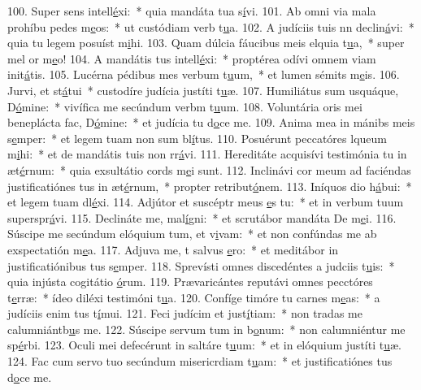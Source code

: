 100. Super sens intell\uline{é}xi:~* quia mandáta tua s\uline{í}vi.
101. Ab omni via mala prohíbu pedes m\uline{e}os:~* ut custódiam verb t\uline{u}a.
102. A judíciis tuis nn declin\uline{á}vi:~* quia tu legem posuíst m\uline{i}hi.
103. Quam dúlcia fáucibus meis elquia t\uline{u}a,~* super mel or m\uline{e}o!
104. A mandátis tus intell\uline{é}xi:~* proptérea odívi omnem viam init\uline{á}tis.
105. Lucérna pédibus mes verbum t\uline{u}um,~* et lumen sémits m\uline{e}is.
106. Jurvi, et st\uline{á}tui~* custodíre judícia justíti t\uline{u}æ.
107. Humiliátus sum usquáque, D\uline{ó}mine:~* vivífica me secúndum verbm t\uline{u}um.
108. Voluntária oris mei beneplácta fac, D\uline{ó}mine:~* et judícia tu d\uline{o}ce me.
109. Anima mea in mánibs meis s\uline{e}mper:~* et legem tuam non sum bl\uline{í}tus.
110. Posuérunt peccatóres lqueum m\uline{i}hi:~* et de mandátis tuis non rr\uline{á}vi.
111. Hereditáte acquisívi testimónia tu in æt\uline{é}rnum:~* quia exsultátio cords m\uline{e}i sunt.
112. Inclinávi cor meum ad faciéndas justificatiónes tus in æt\uline{é}rnum,~* propter retribut\uline{ó}nem.
113. Iníquos dio h\uline{á}bui:~* et legem tuam dl\uline{é}xi.
114. Adjútor et suscéptr meus \uline{e}s tu:~* et in verbum tuum superspr\uline{á}vi.
115. Declináte  me, mal\uline{í}gni:~* et scrutábor mandáta De m\uline{e}i.
116. Súscipe me secúndum elóquium tum, et v\uline{i}vam:~* et non confúndas me ab exspectatión m\uline{e}a.
117. Adjuva me, t salvus \uline{e}ro:~* et meditábor in justificatiónibus tus s\uline{e}mper.
118. Sprevísti omnes discedéntes a judciis t\uline{u}is:~* quia injústa cogitátio \uline{ó}rum.
119. Prævaricántes reputávi omnes pecctóres t\uline{e}rræ:~* ídeo diléxi testimóni t\uline{u}a.
120. Confíge timóre tu carnes m\uline{e}as:~* a judíciis enim tus t\uline{í}mui.
121. Feci judícim et just\uline{í}tiam:~* non tradas me calumniántb\uline{u}s me.
122. Súscipe servum tum in b\uline{o}num:~* non calumniéntur me sp\uline{é}rbi.
123. Oculi mei defecérunt in saltáre t\uline{u}um:~* et in elóquium justíti t\uline{u}æ.
124. Fac cum servo tuo secúndum misericrdiam t\uline{u}am:~* et justificatiónes tus d\uline{o}ce me.
